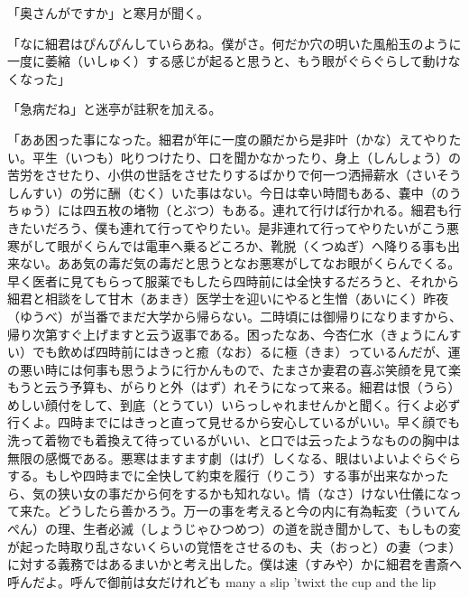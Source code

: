 \documentclass{book}
\begin{document}
「奥さんがですか」と寒月が聞く。

「なに細君はぴんぴんしていらあね。僕がさ。何だか穴の明いた風船玉のように一度に萎縮（いしゅく）する感じが起ると思うと、もう眼がぐらぐらして動けなくなった」

「急病だね」と迷亭が註釈を加える。

「ああ困った事になった。細君が年に一度の願だから是非叶（かな）えてやりたい。平生（いつも）叱りつけたり、口を聞かなかったり、身上（しんしょう）の苦労をさせたり、小供の世話をさせたりするばかりで何一つ洒掃薪水（さいそうしんすい）の労に酬（むく）いた事はない。今日は幸い時間もある、嚢中（のうちゅう）には四五枚の堵物（とぶつ）もある。連れて行けば行かれる。細君も行きたいだろう、僕も連れて行ってやりたい。是非連れて行ってやりたいがこう悪寒がして眼がくらんでは電車へ乗るどころか、靴脱（くつぬぎ）へ降りる事も出来ない。ああ気の毒だ気の毒だと思うとなお悪寒がしてなお眼がくらんでくる。早く医者に見てもらって服薬でもしたら四時前には全快するだろうと、それから細君と相談をして甘木（あまき）医学士を迎いにやると生憎（あいにく）昨夜（ゆうべ）が当番でまだ大学から帰らない。二時頃には御帰りになりますから、帰り次第すぐ上げますと云う返事である。困ったなあ、今杏仁水（きょうにんすい）でも飲めば四時前にはきっと癒（なお）るに極（きま）っているんだが、運の悪い時には何事も思うように行かんもので、たまさか妻君の喜ぶ笑顔を見て楽もうと云う予算も、がらりと外（はず）れそうになって来る。細君は恨（うら）めしい顔付をして、到底（とうてい）いらっしゃれませんかと聞く。行くよ必ず行くよ。四時までにはきっと直って見せるから安心しているがいい。早く顔でも洗って着物でも着換えて待っているがいい、と口では云ったようなものの胸中は無限の感慨である。悪寒はますます劇（はげ）しくなる、眼はいよいよぐらぐらする。もしや四時までに全快して約束を履行（りこう）する事が出来なかったら、気の狭い女の事だから何をするかも知れない。情（なさ）けない仕儀になって来た。どうしたら善かろう。万一の事を考えると今の内に有為転変（ういてんぺん）の理、生者必滅（しょうじゃひつめつ）の道を説き聞かして、もしもの変が起った時取り乱さないくらいの覚悟をさせるのも、夫（おっと）の妻（つま）に対する義務ではあるまいかと考え出した。僕は速（すみや）かに細君を書斎へ呼んだよ。呼んで御前は女だけれども many a slip 'twixt the cup and the lip 
\end{document}
